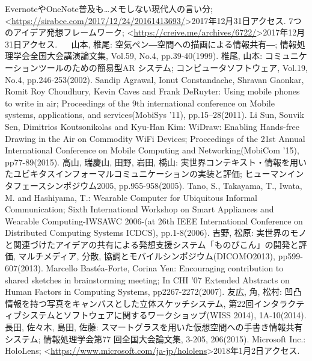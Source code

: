 \documentclass[11pt,a4j, titlepage]{jarticle} %
\begin{document}
\newpage
\begin{thebibliography}{数字}
   EvernoteやOneNote普及も…メモしない現代人の言い分; \textless\url{https://sirabee.com/2017/12/24/20161413693/}\textgreater2017年12月31日アクセス.
   7つのアイデア発想フレームワーク; \textless\url{https://creive.me/archives/6722/}\textgreater2017年12月31日アクセス.
　 山本, 椎尾: 空気ペン―空間への描画による情報共有―; 情報処理学会全国大会講演論文集, Vol.59, No.4,
pp.39-40(1999).
   椎尾, 山本: コミュニケーションツールのための簡易型AR システム; コンピュータソフトウェア, Vol.19,
No.4, pp.246-253(2002).
   Sandip Agrawal, Ionut Constandache, Shravan Gaonkar, Romit Roy Choudhury, Kevin Caves and Frank DeRuyter: Using mobile phones to write in air; Proceedings of the 9th international conference on Mobile systems, applications, and services(MobiSys '11), pp.15–28(2011).
   Li Sun, Souvik Sen, Dimitrios Koutsonikolas and Kyu-Han Kim: WiDraw: Enabling Hands-free Drawing in the Air on Commodity WiFi Devices; Proceedings of the 21st Annual International Conference on Mobile Computing and Networking(MobiCom '15), pp77-89(2015).
   高山, 瑞慶山, 田野, 岩田, 橋山: 実世界コンテキスト・情報を用いたユビキタスインフォーマルコミュニケーションの実装と評価; ヒューマンインタフェースシンポジウム2005, pp.955-958(2005).
   Tano, S., Takayama, T., Iwata, M. and Hashiyama, T.: Wearable Computer for Ubiquitous Informal Communication; Sixth International Workshop on Smart Appliances and Wearable Computing-IWSAWC 2006-(at 26th IEEE International Conference on Distributed Computing Systems
ICDCS), pp.1-8(2006).
   吉野, 松原: 実世界のモノと関連づけたアイデアの共有による発想支援システム「ものぴこん」の開発と評価, マルチメディア, 分散, 協調とモバイルシンポジウム(DICOMO2013), pp599-607(2013).
   	Marcello Bast\'ea-Forte, Corina Yen: Encouraging contribution to shared sketches in brainstorming meeting; In CHI '07 Extended Abstracts on Human Factors in Computing Systems, pp2267-2272(2007). 
   友広, 角, 松村: 凹凸情報を持つ写真をキャンバスとした立体スケッチシステム, 第22回インタラクティブシステムとソフトウェアに関するワークショップ(WISS 2014), 1A-10(2014).
   長田, 佐々木, 島田, 佐藤: スマートグラスを用いた仮想空間への手書き情報共有システム; 情報処理学会第77 回全国大会論文集, 3-205, 206(2015).
   Microsoft Inc.: HoloLens; \textless\url{https://www.microsoft.com/ja-jp/hololens}\textgreater2018年1月2日アクセス.

\end{thebibliography}
\end{document}
